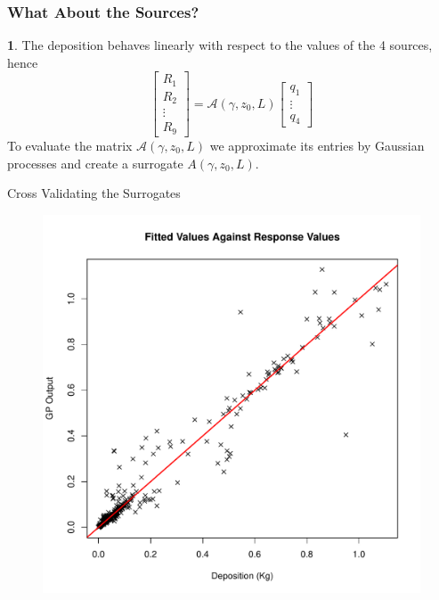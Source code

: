 \documentclass[11pt]{beamer}
\theoremstyle{plain}
\theoremstyle{definition}
\newtheorem{dfn}{}[section]
\begin{document}
\begin{frame}
\frametitle{What About the Sources?}

\begin{dfn}
The deposition behaves linearly  with respect to the values of the 4  sources,
hence
\begin{equation*}
\begin{bmatrix}
R_{1} \\
R_{2} \\
\vdots\\
R_{9}
\end{bmatrix}=\mathcal{A}(\gamma,z_{0},L)
\begin{bmatrix}
q_{1}\\
\vdots\\
q_{4}
\end{bmatrix}
\end{equation*}
To evaluate the matrix $\mathcal{A}(\gamma,z_{0},L)$ we approximate its entries by Gaussian processes
and create a surrogate $A(\gamma,z_{0},L)$.
\end{dfn}
\end{frame}

\begin{frame}{Cross Validating the Surrogates}
\begin{figure}
\includegraphics[scale=0.35]{cross_val.pdf}
\end{figure}

\end{frame}
\end{document}
